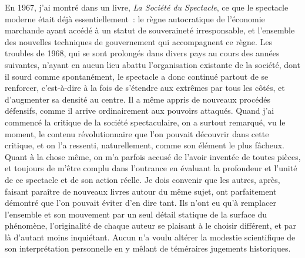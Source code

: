\documentclass[french,twoside]{book} %
\begin{document}
\noindent En 1967, j’ai montré dans un livre, \emph{La Société du Spectacle}, ce que le spectacle moderne était déjà essentiellement : le règne autocratique de l’économie marchande ayant accédé à un statut de souveraineté irresponsable, et l’ensemble des nouvelles techniques de gouvernement qui accompagnent ce règne. Les troubles de 1968, qui se sont prolongés dans divers pays au cours des années suivantes, n’ayant en aucun lieu abattu l’organisation existante de la société, dont il sourd comme spontanément, le spectacle a donc continué partout de se renforcer, c’est-à-dire à la fois de s’étendre aux extrêmes par tous les côtés, et d’augmenter sa densité au centre. Il a même appris de nouveaux procédés défensifs, comme il arrive ordinairement aux pouvoirs attaqués. Quand j’ai commencé la critique de la société spectaculaire, on a surtout remarqué, vu le moment, le contenu révolutionnaire que l’on pouvait découvrir dans cette critique, et on l’a ressenti, naturellement, comme son élément le plus fâcheux. Quant à la chose même, on m’a parfois accusé de l’avoir inventée de toutes pièces, et toujours de m’être complu dans l’outrance en évaluant la profondeur et l’unité de ce spectacle et de son action réelle. Je dois convenir que les autres, après, faisant paraître de nouveaux livres autour du même sujet, ont parfaitement démontré que l’on pouvait éviter d’en dire tant. Ils n’ont eu qu’à remplacer l’ensemble et son mouvement par un seul détail statique de la surface du phénomène, l’originalité de chaque auteur se plaisant à le choisir différent, et par là d’autant moins inquiétant. Aucun n’a voulu altérer la modestie scientifique de son interprétation personnelle en y mêlant de téméraires jugements historiques.\par
\end{document}
